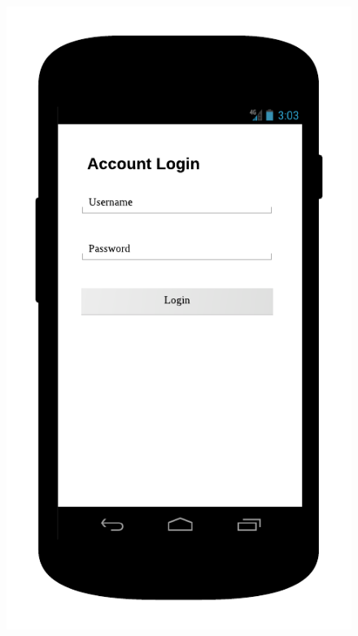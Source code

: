 \begin{description}
\begin{figure}
\centering
\begin{minipage}{.5\textwidth}
  \centering
  \includegraphics[width=.7\linewidth]{Images/mockups/login.png}
\end{minipage}%
\begin{minipage}{.5\textwidth}
  \centering

\end{minipage}
\end{figure}
\end{description}
